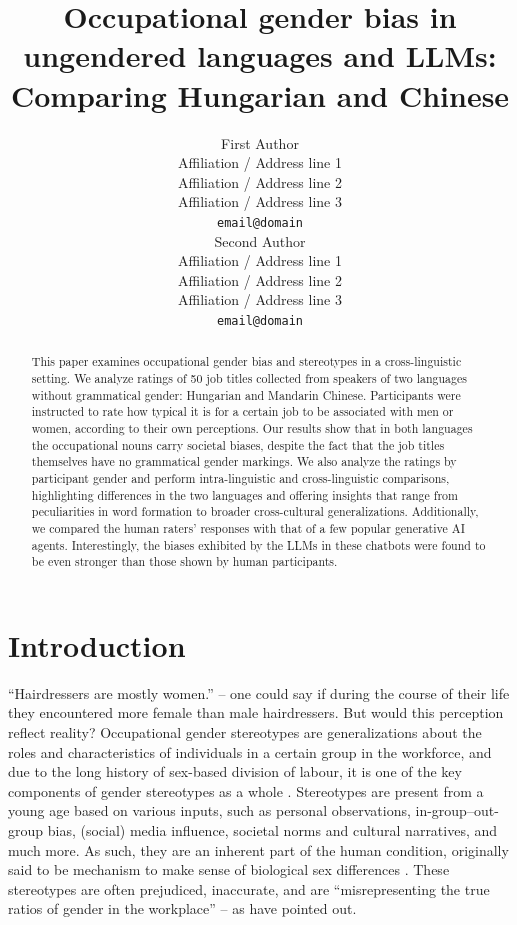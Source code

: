 \documentclass[11pt]{article}
\title{Occupational gender bias in ungendered languages and LLMs: Comparing Hungarian and Chinese}
\author{First Author \\
  Affiliation / Address line 1 \\
  Affiliation / Address line 2 \\
  Affiliation / Address line 3 \\
  \texttt{email@domain} \\\And
  Second Author \\
  Affiliation / Address line 1 \\
  Affiliation / Address line 2 \\
  Affiliation / Address line 3 \\
  \texttt{email@domain} \\}
\begin{document}
\maketitle

\begin{abstract}
This paper examines occupational gender bias and stereotypes in a cross-linguistic setting. We analyze ratings of 50 job titles collected from speakers of two languages without grammatical gender: Hungarian and Mandarin Chinese. Participants were instructed to rate how typical it is for a certain job to be associated with men or women, according to their own perceptions.
Our results show that in both languages the occupational nouns carry societal biases, despite the fact that the job titles themselves have no grammatical gender markings. We also analyze the ratings by participant gender and perform intra-linguistic and cross-linguistic comparisons, highlighting differences in the two languages and offering insights that range from peculiarities in word formation to broader cross-cultural generalizations.
Additionally, we compared the human raters' responses with that of a few popular generative AI agents. Interestingly, the biases exhibited by the LLMs in these chatbots were found to be even stronger than those shown by human participants.

\end{abstract}

\section{Introduction}

``Hairdressers are mostly women.'' -- one could say if during the course of their life they encountered more female than male hairdressers. But would this perception reflect reality? 
Occupational gender stereotypes are generalizations about the roles and characteristics of individuals in a certain group in the workforce, and due to the long history of sex-based division of labour, it is one of the key components of gender stereotypes as a whole \citep{deaux_1984_structure}. Stereotypes are present from a young age \citep{canessapollard_2022_development} based on various inputs, such as personal observations, in-group--out-group bias, (social) media influence, societal norms and cultural narratives, and much more. As such, they are an inherent part of the human condition, originally said to be mechanism to make sense of biological sex differences \citep{levanon_2016_persistence}. These stereotypes are often prejudiced, inaccurate, and are ``misrepresenting the true ratios of gender in the workplace'' \citep{garnham_2015_true,gygax_2016_what} -- as \citet[][2]{kaukonen_2025_gender} have pointed out.
\end{document}
